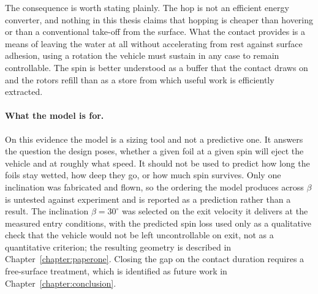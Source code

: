 The consequence is worth stating plainly.  The hop is not an efficient energy
converter, and nothing in this thesis claims that hopping is cheaper than
hovering or than a conventional take-off from the surface.  What the contact
provides is a means of leaving the water at all without accelerating from rest
against surface adhesion, using a rotation the vehicle must sustain in any case
to remain controllable.  The spin is better understood as a buffer that the
contact draws on and the rotors refill than as a store from which useful work
is efficiently extracted.

\paragraph{What the model is for.}
On this evidence the model is a sizing tool and not a predictive one.  It
answers the question the design poses, whether a given foil at a given spin
will eject the vehicle and at roughly what speed.  It should not be used to
predict how long the foils stay wetted, how deep they go, or how much spin
survives.  Only one inclination was fabricated and flown, so the ordering the
model produces across $\beta$ is untested against experiment and is reported
as a prediction rather than a result.  The inclination
$\beta = 30^\circ$ was selected on the exit velocity it delivers at the
measured entry conditions, with the predicted spin loss used only as a
qualitative check that the vehicle would not be left uncontrollable on exit,
not as a quantitative criterion; the resulting geometry is described in
Chapter~\ref{chapter:paperone}.  Closing the gap on the contact
duration requires a free-surface treatment, which is identified as future work
in Chapter~\ref{chapter:conclusion}.
